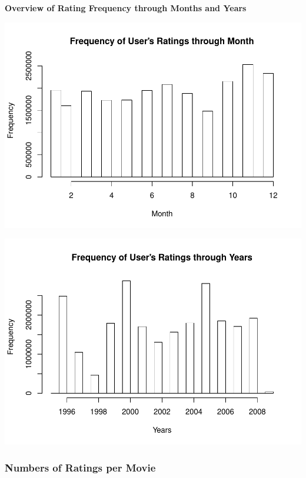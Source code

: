\documentclass[]{article}
\begin{document}
\textbf{Overview of Rating Frequency through Months and Years}

\begin{center}\includegraphics{MovieLens_Project_Report_files/figure-latex/unnamed-chunk-18-1} \end{center}

\begin{center}\includegraphics{MovieLens_Project_Report_files/figure-latex/unnamed-chunk-18-2} \end{center}

\hypertarget{numbers-of-ratings-per-movie}{%
\subsubsection{Numbers of Ratings per
Movie}\label{numbers-of-ratings-per-movie}}
\end{document}
